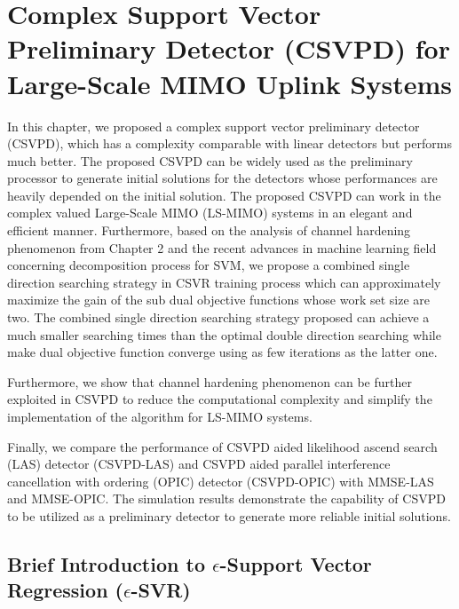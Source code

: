 \resetdatestamp



\chapter{Complex Support Vector Preliminary Detector (CSVPD) for Large-Scale MIMO Uplink Systems}\label{Chapter CSVPD}
 

 


In this chapter, we proposed a complex support vector preliminary detector (CSVPD), which has a complexity  comparable with linear detectors but performs much better. The proposed CSVPD can be widely used as the preliminary processor to generate initial solutions for the detectors whose performances are heavily depended on the initial solution.
 The proposed CSVPD can work in the complex valued Large-Scale MIMO (LS-MIMO) systems in an elegant and efficient manner.  Furthermore, based on the analysis of channel hardening phenomenon from Chapter 2 and the recent advances in machine learning field concerning decomposition process for SVM\cite{steinwart2011training}, we propose a combined single direction searching strategy in CSVR training process which can approximately maximize the gain of the sub dual objective functions whose work set size are two. The combined single direction searching strategy proposed can achieve a much smaller searching times than the optimal double direction searching while make dual objective function converge using as few iterations as the latter one. 
  
  Furthermore, we show that channel hardening phenomenon can be further exploited in CSVPD to reduce the computational complexity and simplify the implementation of the algorithm for LS-MIMO systems.
  
   Finally,  we compare the performance of CSVPD aided likelihood ascend search (LAS) detector (CSVPD-LAS) and CSVPD aided parallel interference cancellation with ordering (OPIC) detector (CSVPD-OPIC) with MMSE-LAS and MMSE-OPIC. The simulation results demonstrate the capability of CSVPD to be utilized as a preliminary detector to generate more reliable initial solutions.  


\section{Brief Introduction to $\epsilon$-Support Vector Regression ($\epsilon$-SVR)}
